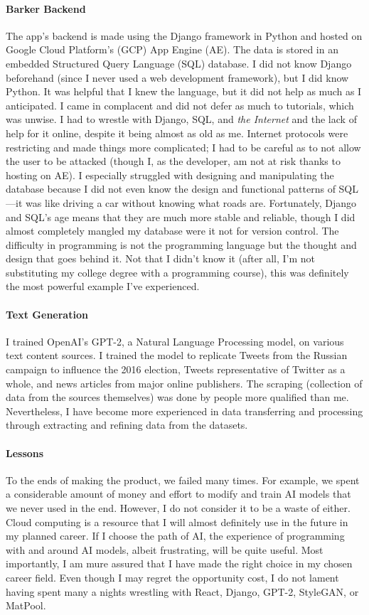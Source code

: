 \documentclass[12pt, letterpaper]{article}
\begin{document}
\paragraph{Barker Backend}The app's backend is made using the Django framework in Python and hosted on Google Cloud Platform's (GCP) App Engine (AE). The data is stored in an embedded Structured Query Language (SQL) database. I did not know Django beforehand (since I never used a web development framework), but I did know Python. It was helpful that I knew the language, but it did not help as much as I anticipated. I came in complacent and did not defer as much to tutorials, which was unwise. I had to wrestle with Django, SQL, and \emph{the Internet} and the lack of help for it online, despite it being almost as old as me. Internet protocols were restricting and made things more complicated; I had to be careful as to not allow the user to be attacked (though I, as the developer, am not at risk thanks to hosting on AE). I especially struggled with designing and manipulating the database because I did not even know the design and functional patterns of SQL---it was like driving a car without knowing what roads are. Fortunately, Django and SQL's age means that they are much more stable and reliable, though I did almost completely mangled my database were it not for version control. The difficulty in programming is not the programming language but the thought and design that goes behind it. Not that I didn't know it (after all, I'm not substituting my college degree with a programming course), this was definitely the most powerful example I've experienced.

\paragraph{Text Generation}I trained OpenAI's GPT-2, a Natural Language Processing model, on various text content sources. I trained the model to replicate Tweets from the Russian campaign to influence the 2016 election, Tweets representative of Twitter as a whole, and news articles from major online publishers. The scraping (collection of data from the sources themselves) was done by people more qualified than me. Nevertheless, I have become more experienced in data transferring and processing through extracting and refining data from the datasets.

\paragraph{Lessons}To the ends of making the product, we failed many times. For example, we spent a considerable amount of money and effort to modify and train AI models that we never used in the end. However, I do not consider it to be a waste of either. Cloud computing is a resource that I will almost definitely use in the future in my planned career. If I choose the path of AI, the experience of programming with and around AI models, albeit frustrating, will be quite useful. Most importantly, I am mure assured that I have made the right choice in my chosen career field. Even though I may regret the opportunity cost, I do not lament having spent many a nights wrestling with React, Django, GPT-2, StyleGAN, or MatPool. 
\end{document}

